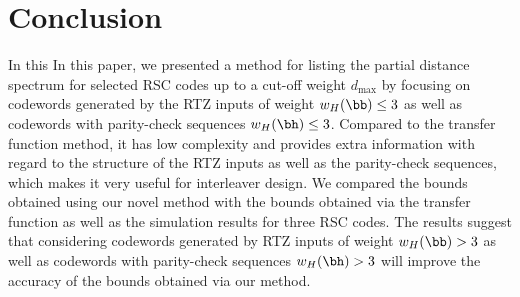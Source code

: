 \section{Conclusion}
\label{sec7}
 



In this In this paper, we presented a method for listing the partial distance spectrum for selected RSC codes up to a cut-off weight $d_{\text{max}}$ by focusing on codewords generated by the RTZ inputs of weight $w_H(\bb) \leq 3$ as well as codewords with parity-check sequences $w_H(\bh) \leq 3$. Compared to the transfer function method, it has low complexity and provides extra information with regard to the structure of the RTZ inputs as well as the parity-check sequences, which makes it very useful for interleaver design. We compared the bounds obtained using our novel method with the bounds obtained via the transfer function as well as the simulation results for three RSC codes. The results suggest that considering codewords generated by RTZ inputs of weight $w_H(\bb) > 3$ as well as codewords with parity-check sequences $w_H(\bh) > 3$  will improve the accuracy of the bounds obtained via our method.